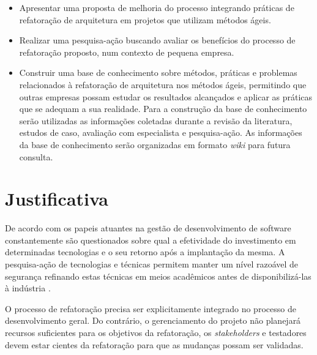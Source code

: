 \begin{itemize}
    \item Apresentar uma proposta de melhoria do processo integrando práticas de refatoração de arquitetura em projetos que utilizam métodos ágeis.
    \item Realizar uma pesquisa-ação buscando avaliar os benefícios do processo de refatoração proposto, num contexto de pequena empresa.
    \item Construir uma base de conhecimento sobre métodos, práticas e problemas relacionados à refatoração de arquitetura nos métodos ágeis, permitindo que outras empresas possam estudar os resultados alcançados e aplicar as práticas que se adequam a sua realidade. Para a construção da base de conhecimento serão utilizadas as informações coletadas durante a revisão da literatura, estudos de caso, avaliação com especialista e pesquisa-ação. As informações da base de conhecimento serão organizadas em formato \textit{wiki} para futura consulta.

\end{itemize}

\section{Justificativa}

De acordo com \cite{kitchenham2004evidence} os papeis atuantes na gestão de desenvolvimento de software constantemente são questionados sobre qual a efetividade do investimento em determinadas tecnologias e o seu retorno após a implantação da mesma. A pesquisa-ação de tecnologias e técnicas permitem manter um nível razoável de segurança refinando estas técnicas em meios acadêmicos antes de disponibilizá-las à indústria \cite{dias2010developing}.

O processo de refatoração precisa ser explicitamente integrado no processo de desenvolvimento geral. Do contrário, o gerenciamento do projeto não planejará recursos suficientes para os objetivos da refatoração, os \textit{stakeholders} e testadores devem estar cientes da refatoração para que as mudanças possam ser validadas.

